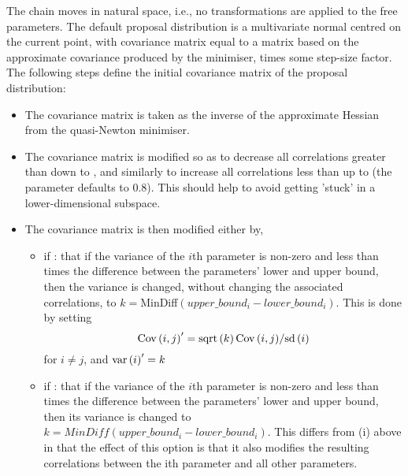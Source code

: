 The chain moves in natural space, i.e., no transformations are applied to the free parameters. The default proposal distribution is a multivariate normal centred on the current point, with covariance matrix equal to a matrix based on the approximate covariance produced by the minimiser, times some step-size factor. The following steps define the initial covariance matrix of the proposal distribution: 

\begin{itemize}
\item The covariance matrix is taken as the inverse of the approximate Hessian from the quasi-Newton minimiser.

\item The covariance matrix is modified so as to decrease all correlations greater than  down to , and similarly to increase all correlations less than   up to  (the  parameter defaults to 0.8). This should help to avoid getting 'stuck' in a lower-dimensional subspace.

\item The covariance matrix is then modified either by,

\begin{itemize}
\item if : that if the variance of the $i$th parameter is non-zero and less than  times the difference between the parameters' lower and upper bound, then the variance is changed, without changing the associated correlations, to $k=$MinDiff$(upper\_bound_i-lower\_bound_i)$. This is done by setting \[
{\mathop{\rm Cov}\nolimits} \left( {i,j} \right)^\prime   = {{{\mathop{\rm sqrt}\nolimits} \left( k \right){\mathop{\rm Cov}\nolimits} \left( {i,j} \right)} \mathord{\left/
{\vphantom {{{\mathop{\rm sqrt}\nolimits} \left( k \right){\mathop{\rm Cov}\nolimits} \left( {i,j} \right)} {{\mathop{\rm sd}\nolimits} \left( i \right)}}} \right.
\kern-\nulldelimiterspace} {{\mathop{\rm sd}\nolimits} \left( i \right)}}
\]
for $i \ne j$, and ${\mathop{\rm var}} \left( i \right)^\prime   = k$

\item if : that if the variance of the $i$th parameter is non-zero and less than  times the difference between the parameters' lower and upper bound, then its variance is changed to $k=MinDiff(upper\_bound_i-lower\_bound_i)$. This differs from (i) above in that the effect of this option is that it also modifies the resulting correlations between the ith parameter and all other parameters.
\end{itemize}


\end{itemize}
